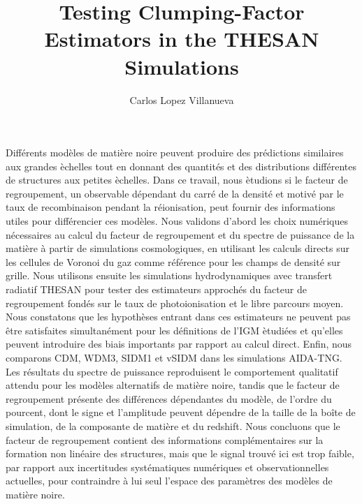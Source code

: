 \documentclass[%
 reprint,
nofootinbib,
 amsmath,amssymb,
 aps,
]{revtex4-2}
\begin{document}
\begin{center}
\begin{minipage}{0.82\textwidth}
\noindent
Diff\'erents mod\`eles de mati\`ere noire peuvent produire des pr\'edictions similaires aux grandes \`echelles tout en donnant des quantit\'es et des distributions diff\'erentes de structures aux petites \`echelles. Dans ce travail, nous \`etudions si le facteur de regroupement, un observable d\'ependant du carr\'e de la densit\'e et motiv\'e par le taux de recombinaison pendant la r\'eionisation, peut fournir des informations utiles pour diff\'erencier ces mod\`eles. Nous validons d'abord les choix num\'eriques n\'ecessaires au calcul du facteur de regroupement et du spectre de puissance de la mati\`ere \`a partir de simulations cosmologiques, en utilisant les calculs directs sur les cellules de Voronoi du gaz comme r\'ef\'erence pour les champs de densit\'e sur grille. Nous utilisons ensuite les simulations hydrodynamiques avec transfert radiatif THESAN pour tester des estimateurs approch\'es du facteur de regroupement fond\'es sur le taux de photoionisation et le libre parcours moyen. Nous constatons que les hypoth\`eses entrant dans ces estimateurs ne peuvent pas \^etre satisfaites simultan\'ement pour les d\'efinitions de l'IGM \`etudi\'ees et qu'elles peuvent introduire des biais importants par rapport au calcul direct. Enfin, nous comparons CDM, WDM3, SIDM1 et vSIDM dans les simulations AIDA-TNG. Les r\'esultats du spectre de puissance reproduisent le comportement qualitatif attendu pour les mod\`eles alternatifs de mati\`ere noire, tandis que le facteur de regroupement pr\'esente des diff\'erences d\'ependantes du mod\`ele, de l'ordre du pourcent, dont le signe et l'amplitude peuvent d\'ependre de la taille de la bo\^ite de simulation, de la composante de mati\`ere et du redshift. Nous concluons que le facteur de regroupement contient des informations compl\'ementaires sur la formation non lin\'eaire des structures, mais que le signal trouv\'e ici est trop faible, par rapport aux incertitudes syst\'ematiques num\'eriques et observationnelles actuelles, pour contraindre \`a lui seul l'espace des param\`etres des mod\`eles de mati\`ere noire.
\end{minipage}
\end{center}

\clearpage
\twocolumngrid
\pagestyle{plain}

\title{Testing Clumping-Factor Estimators in the THESAN Simulations}%

\author{Carlos Lopez Villanueva}
%
\end{document}
